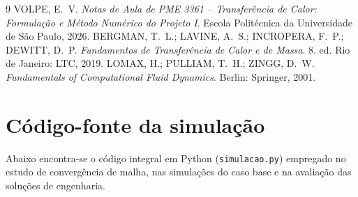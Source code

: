 \documentclass[11pt,a4paper]{article}
\begin{document}
\begin{thebibliography}{9}
     VOLPE, E.~V. \textit{Notas de Aula de PME 3361 -- Transferência de Calor: Formulação e Método Numérico do Projeto I}. Escola Politécnica da Universidade de São Paulo, 2026.
     BERGMAN, T.~L.; LAVINE, A.~S.; INCROPERA, F.~P.; DEWITT, D.~P. \textit{Fundamentos de Transferência de Calor e de Massa}. 8. ed. Rio de Janeiro: LTC, 2019.
     LOMAX, H.; PULLIAM, T.~H.; ZINGG, D.~W. \textit{Fundamentals of Computational Fluid Dynamics}. Berlin: Springer, 2001.
\end{thebibliography}

\newpage
\appendix
\section{Código-fonte da simulação}
\label{ap:codigo}
Abaixo encontra-se o código integral em Python (\texttt{simulacao.py}) empregado no estudo de convergência de malha, nas simulações do caso base e na avaliação das soluções de engenharia.


\end{document}
